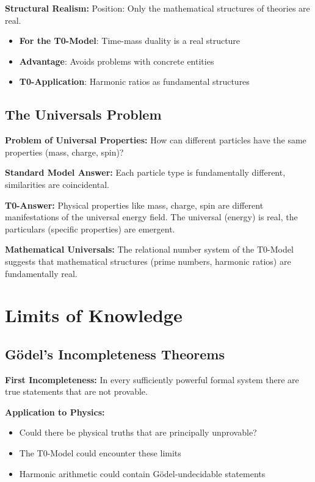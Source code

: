 \documentclass[12pt,a4paper]{report}
\begin{document}
	\textbf{Structural Realism:}
	Position: Only the mathematical structures of theories are real.
	\begin{itemize}
		\item \textbf{For the T0-Model}: Time-mass duality is a real structure
		\item \textbf{Advantage}: Avoids problems with concrete entities
		\item \textbf{T0-Application}: Harmonic ratios as fundamental structures
	\end{itemize}
	
	\subsection{The Universals Problem}\label{subsec:universals_problem}
	
	\textbf{Problem of Universal Properties:}
	How can different particles have the same properties (mass, charge, spin)?
	
	\textbf{Standard Model Answer:}
	Each particle type is fundamentally different, similarities are coincidental.
	
	\textbf{T0-Answer:}
	Physical properties like mass, charge, spin are different manifestations of the universal energy field. The universal (energy) is real, the particulars (specific properties) are emergent.
	
	\textbf{Mathematical Universals:}
	The relational number system of the T0-Model suggests that mathematical structures (prime numbers, harmonic ratios) are fundamentally real.
	
	\section{Limits of Knowledge}\label{sec:limits_knowledge}
	
	\subsection{Gödel's Incompleteness Theorems}\label{subsec:godel_incompleteness}
	
	\textbf{First Incompleteness:}
	In every sufficiently powerful formal system there are true statements that are not provable.
	
	\textbf{Application to Physics:}
	\begin{itemize}
		\item Could there be physical truths that are principally unprovable?
		\item The T0-Model could encounter these limits
		\item Harmonic arithmetic could contain Gödel-undecidable statements
	\end{itemize}
	
\end{document}
